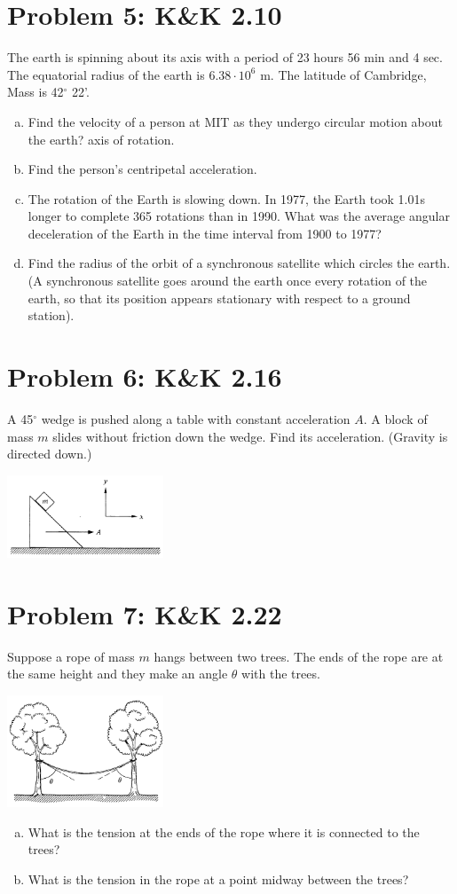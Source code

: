 \documentclass[problems]{esg8012pset}
\begin{document}
\section*{Problem 5: K\&K 2.10}
  The earth is spinning about its axis with a period of 23 hours 56 min and 4 sec. The equatorial radius of the earth is $6.38\cdot 10^{6}$ m. The latitude of Cambridge, Mass is 42$^{\circ}$ 22'.
  \begin{enumerate}[a)]
    \item Find the velocity of a person at MIT as they undergo circular motion about the earth? axis of rotation.
    \item Find the person's centripetal acceleration.
    \item The rotation of the Earth is slowing down. In 1977, the Earth took 1.01s longer to complete 365 rotations than in 1990. What was the average angular deceleration of the Earth in the time interval from 1900 to 1977?
    \item Find the radius of the orbit of a synchronous satellite which circles the earth. (A synchronous satellite goes around the earth once every rotation of the earth, so that its position appears stationary with respect to a ground station).
  \end{enumerate}
\section*{Problem 6: K\&K 2.16}
  A 45$^{\circ}$ wedge is pushed along a table with constant acceleration $A$. A block of mass $m$ slides without friction down the wedge. Find its acceleration. (Gravity is directed down.)
  \begin{center}\includegraphics[width=0.35\textwidth]{ps02_4}\end{center}
\section*{Problem 7: K\&K 2.22}
  Suppose a rope of mass $m$ hangs between two trees. The ends of the rope are at the same height and they make an angle $\theta$ with the trees.
  \begin{center}\includegraphics[width=0.35\textwidth]{ps02_5}\end{center}
  \begin{enumerate}[a)]
    \item What is the tension at the ends of the rope where it is connected to the trees?
    \item What is the tension in the rope at a point midway between the trees?
  \end{enumerate}
\end{document}
